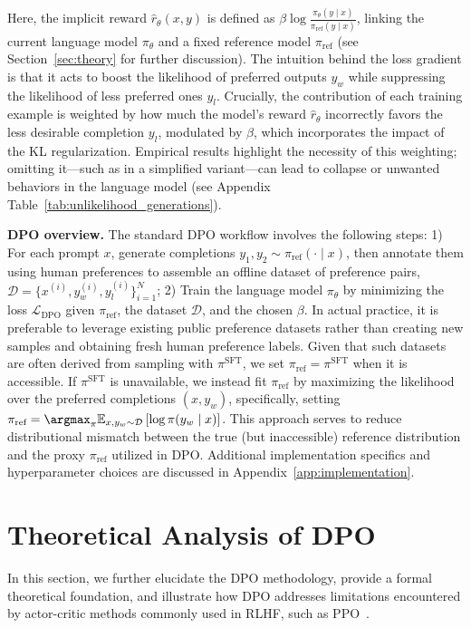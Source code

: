 Here, the implicit reward $\hat{r}_\theta(x, y)$ is defined as $\beta \log \frac{\pi_\theta(y \mid x)}{\pi_\text{ref}(y \mid x)}$, linking the current language model $\pi_\theta$ and a fixed reference model $\pi_\text{ref}$ (see Section~\ref{sec:theory} for further discussion). The intuition behind the loss gradient is that it acts to boost the likelihood of preferred outputs $y_w$ while suppressing the likelihood of less preferred ones $y_l$. Crucially, the contribution of each training example is weighted by how much the model’s reward $\hat{r}_\theta$ incorrectly favors the less desirable completion $y_l$, modulated by $\beta$, which incorporates the impact of the KL regularization. Empirical results highlight the necessity of this weighting; omitting it—such as in a simplified variant—can lead to collapse or unwanted behaviors in the language model (see Appendix Table~\ref{tab:unlikelihood_generations}).

\textbf{DPO overview.} The standard DPO workflow involves the following steps: 1) For each prompt $x$, generate completions $y_1, y_2 \sim \pi_\text{ref}(\cdot \mid x)$, then annotate them using human preferences to assemble an offline dataset of preference pairs, $\mathcal{D} = \{x^{(i)}, y_w^{(i)}, y_l^{(i)}\}_{i=1}^N$; 2) Train the language model $\pi_\theta$ by minimizing the loss $\mathcal{L}_\text{DPO}$ given $\pi_\text{ref}$, the dataset $\mathcal{D}$, and the chosen $\beta$. In actual practice, it is preferable to leverage existing public preference datasets rather than creating new samples and obtaining fresh human preference labels. Given that such datasets are often derived from sampling with $\pi^\text{SFT}$, we set $\pi_\text{ref} = \pi^\text{SFT}$ when it is accessible. If $\pi^\text{SFT}$ is unavailable, we instead fit $\pi_\text{ref}$ by maximizing the likelihood over the preferred completions ${(x, y_w)}$, specifically, setting ${\pi_\text{ref} = \argmax_{\pi}\mathbb{E}_{x, y_w \sim \mathcal{D}}\left[\log \pi(y_w \mid x)\right]}$. This approach serves to reduce distributional mismatch between the true (but inaccessible) reference distribution and the proxy $\pi_\text{ref}$ utilized in DPO. Additional implementation specifics and hyperparameter choices are discussed in Appendix~\ref{app:implementation}.

\section{Theoretical Analysis of DPO}
In this section, we further elucidate the DPO methodology, provide a formal theoretical foundation, and illustrate how DPO addresses limitations encountered by actor-critic methods commonly used in RLHF, such as PPO~\cite{schulman2017proximal}.

